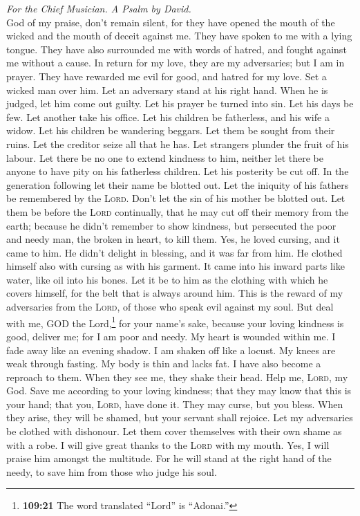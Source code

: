 \emph{For the Chief Musician. A Psalm by David.}\\
 God of my praise, don't remain silent,  for
they have opened the mouth of the wicked and the mouth of deceit against
me. They have spoken to me with a lying tongue.  They have
also surrounded me with words of hatred, and fought against me without a
cause.  In return for my love, they are my adversaries;
but I am in prayer.  They have rewarded me evil for good,
and hatred for my love.  Set a wicked man over him. Let an
adversary stand at his right hand.  When he is judged, let
him come out guilty. Let his prayer be turned into sin. 
Let his days be few. Let another take his office.  Let his
children be fatherless, and his wife a widow.  Let his
children be wandering beggars. Let them be sought from their ruins.
 Let the creditor seize all that he has. Let strangers
plunder the fruit of his labour.  Let there be no one to
extend kindness to him, neither let there be anyone to have pity on his
fatherless children.  Let his posterity be cut off. In
the generation following let their name be blotted out. 
Let the iniquity of his fathers be remembered by the \textsc{Lord}.
Don't let the sin of his mother be blotted out.  Let them
be before the \textsc{Lord} continually, that he may cut off their
memory from the earth;  because he didn't remember to
show kindness, but persecuted the poor and needy man, the broken in
heart, to kill them.  Yes, he loved cursing, and it came
to him. He didn't delight in blessing, and it was far from him.
 He clothed himself also with cursing as with his
garment. It came into his inward parts like water, like oil into his
bones.  Let it be to him as the clothing with which he
covers himself, for the belt that is always around him. 
This is the reward of my adversaries from the \textsc{Lord}, of those
who speak evil against my soul.  But deal with me, GOD
the Lord,\footnote{\textbf{109:21} The word translated ``Lord'' is
  ``Adonai.''} for your name's sake, because your loving kindness is
good, deliver me;  for I am poor and needy. My heart is
wounded within me.  I fade away like an evening shadow. I
am shaken off like a locust.  My knees are weak through
fasting. My body is thin and lacks fat.  I have also
become a reproach to them. When they see me, they shake their head.
 Help me, \textsc{Lord}, my God. Save me according to
your loving kindness;  that they may know that this is
your hand; that you, \textsc{Lord}, have done it.  They
may curse, but you bless. When they arise, they will be shamed, but your
servant shall rejoice.  Let my adversaries be clothed
with dishonour. Let them cover themselves with their own shame as with a
robe.  I will give great thanks to the \textsc{Lord} with
my mouth. Yes, I will praise him amongst the multitude. 
For he will stand at the right hand of the needy, to save him from those
who judge his soul.


